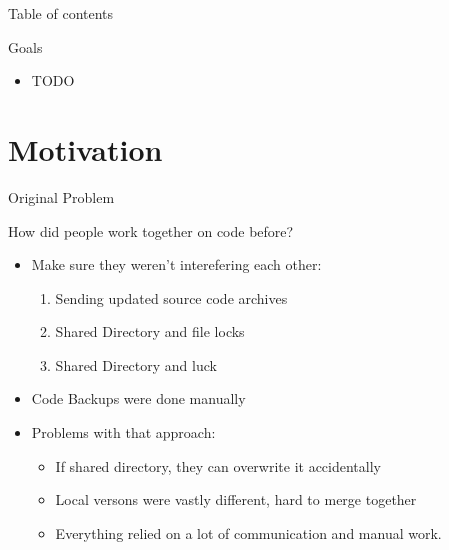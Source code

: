 \documentclass[compress,aspectratio=169]{beamer}
\begin{document}
	\begin{frame}[plain]
		\titlepage
	\end{frame}

	\begin{frame}[t]{Table of contents}
		\tableofcontents[subsectionstyle=hide/hide]
	\end{frame}


	\begin{frame}{Goals}
		\begin{itemize}
			\item TODO
		\end{itemize}
	\end{frame}

	\section{Motivation}

	\begin{frame}{Original Problem}
    \begin{block}{How did people work together on code before?}
		  \begin{itemize}
        \item Make sure they weren't interefering each other:
          \begin{enumerate}
            \item Sending updated source code archives
            \item Shared Directory and file locks
            \item Shared Directory and luck
          \end{enumerate}
		  	\item Code Backups were done manually
        \item Problems with that approach:
          \begin{itemize}
            \item If shared directory, they can overwrite it accidentally
            \item Local versons were vastly different, hard to merge together
            \item Everything relied on a lot of communication and manual work.
          \end{itemize}
		  \end{itemize}
    \end{block}
	\end{frame}
\end{document}
